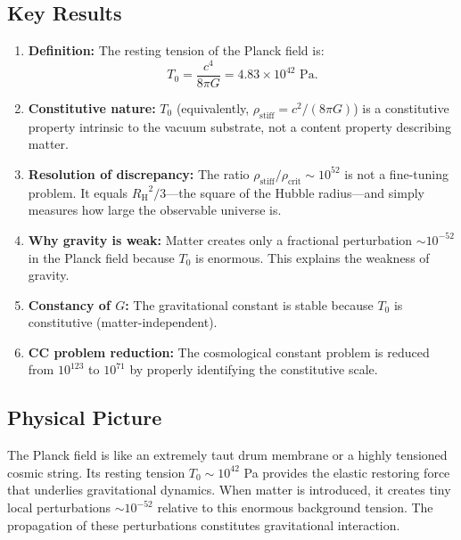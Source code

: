 \documentclass[11pt,a4paper]{article}
\newcommand{\rhocrit}{\ensuremath{\rho_{\mathrm{crit}}}}
\newcommand{\rhostiff}{\ensuremath{\rho_{\mathrm{stiff}}}}
\newcommand{\Tzero}{\ensuremath{T_0}}
\newcommand{\RH}{\ensuremath{R_{\mathrm{H}}}}
\theoremstyle{definition}
\begin{document}
\subsection{Key Results}

\begin{enumerate}
    \item \textbf{Definition:} The resting tension of the Planck field is:
    \begin{equation}
    \Tzero = \frac{c^4}{8\pi G} = 4.83 \times 10^{42} \text{ Pa}.
    \end{equation}

    \item \textbf{Constitutive nature:} $\Tzero$ (equivalently, $\rhostiff = c^2/(8\pi G)$) is a constitutive property intrinsic to the vacuum substrate, not a content property describing matter.

    \item \textbf{Resolution of discrepancy:} The ratio $\rhostiff/\rhocrit \sim 10^{52}$ is not a fine-tuning problem. It equals $\RH^2/3$---the square of the Hubble radius---and simply measures how large the observable universe is.

    \item \textbf{Why gravity is weak:} Matter creates only a fractional perturbation $\sim 10^{-52}$ in the Planck field because $\Tzero$ is enormous. This explains the weakness of gravity.

    \item \textbf{Constancy of $G$:} The gravitational constant is stable because $\Tzero$ is constitutive (matter-independent).

    \item \textbf{CC problem reduction:} The cosmological constant problem is reduced from $10^{123}$ to $10^{71}$ by properly identifying the constitutive scale.
\end{enumerate}

\subsection{Physical Picture}

The Planck field is like an extremely taut drum membrane or a highly tensioned cosmic string. Its resting tension $\Tzero \sim 10^{42}$ Pa provides the elastic restoring force that underlies gravitational dynamics. When matter is introduced, it creates tiny local perturbations $\sim 10^{-52}$ relative to this enormous background tension. The propagation of these perturbations constitutes gravitational interaction.
\end{document}
